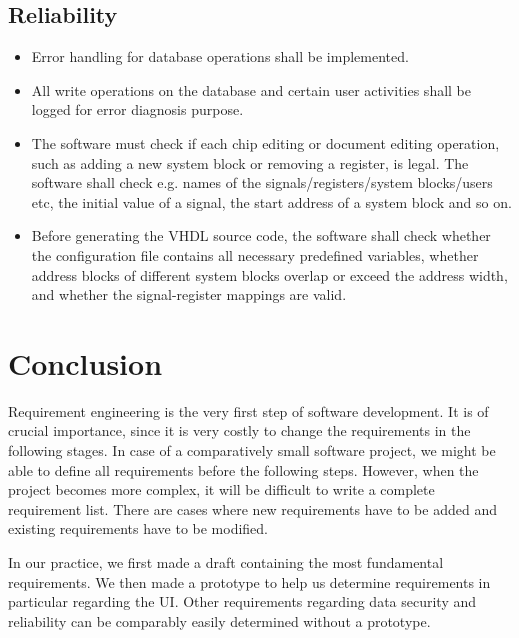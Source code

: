 \subsection{Reliability}
\begin{itemize}
\item Error handling for database operations shall be implemented.
\item All write operations on the database and certain user activities shall be logged for error diagnosis purpose.
\item The software must check if each chip editing or document editing operation, such as adding a new system block or removing a register, is legal. The software shall check e.g. names of the signals/registers/system blocks/users etc, the initial value of a signal, the start address of a system block and so on.
\item Before generating the VHDL source code, the software shall check whether the configuration file contains all necessary predefined variables, whether address blocks of different system blocks overlap or exceed the address width, and whether the signal-register mappings are valid.
\end{itemize}

\section{Conclusion}
Requirement engineering is the very first step of software development. It is of crucial importance, since it is very costly to change the requirements in the following stages. In case of a comparatively small software project, we might be able to define all requirements before the following steps. However, when the project becomes more complex, it will be difficult to write a complete requirement list. There are cases where new requirements have to be added and existing requirements have to be modified.

In our practice, we first made a draft containing the most fundamental requirements. We then made a prototype to help us determine requirements in particular regarding the UI. Other requirements regarding data security and reliability can be comparably easily determined without a prototype.